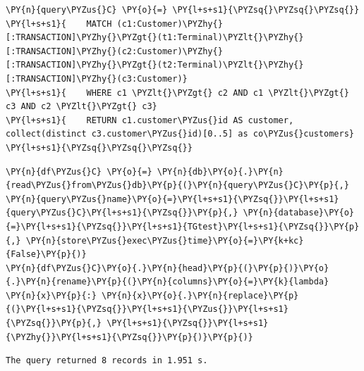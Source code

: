     \begin{tcolorbox}[breakable, size=fbox, boxrule=1pt, pad at break*=1mm,colback=cellbackground, colframe=cellborder]
\begin{Verbatim}[commandchars=\\\{\}]
\PY{n}{query\PYZus{}C} \PY{o}{=} \PY{l+s+s1}{\PYZsq{}\PYZsq{}\PYZsq{}}
\PY{l+s+s1}{    MATCH (c1:Customer)\PYZhy{}[:TRANSACTION]\PYZhy{}\PYZgt{}(t1:Terminal)\PYZlt{}\PYZhy{}[:TRANSACTION]\PYZhy{}(c2:Customer)\PYZhy{}[:TRANSACTION]\PYZhy{}\PYZgt{}(t2:Terminal)\PYZlt{}\PYZhy{}[:TRANSACTION]\PYZhy{}(c3:Customer)}
\PY{l+s+s1}{    WHERE c1 \PYZlt{}\PYZgt{} c2 AND c1 \PYZlt{}\PYZgt{} c3 AND c2 \PYZlt{}\PYZgt{} c3}
\PY{l+s+s1}{    RETURN c1.customer\PYZus{}id AS customer, collect(distinct c3.customer\PYZus{}id)[0..5] as co\PYZus{}customers}
\PY{l+s+s1}{\PYZsq{}\PYZsq{}\PYZsq{}}
\end{Verbatim}
\end{tcolorbox}

    \begin{tcolorbox}[breakable, size=fbox, boxrule=1pt, pad at break*=1mm,colback=cellbackground, colframe=cellborder]
\begin{Verbatim}[commandchars=\\\{\}]
\PY{n}{df\PYZus{}C} \PY{o}{=} \PY{n}{db}\PY{o}{.}\PY{n}{read\PYZus{}from\PYZus{}db}\PY{p}{(}\PY{n}{query\PYZus{}C}\PY{p}{,} \PY{n}{query\PYZus{}name}\PY{o}{=}\PY{l+s+s1}{\PYZsq{}}\PY{l+s+s1}{query\PYZus{}C}\PY{l+s+s1}{\PYZsq{}}\PY{p}{,} \PY{n}{database}\PY{o}{=}\PY{l+s+s1}{\PYZsq{}}\PY{l+s+s1}{TGtest}\PY{l+s+s1}{\PYZsq{}}\PY{p}{,} \PY{n}{store\PYZus{}exec\PYZus{}time}\PY{o}{=}\PY{k+kc}{False}\PY{p}{)}
\PY{n}{df\PYZus{}C}\PY{o}{.}\PY{n}{head}\PY{p}{(}\PY{p}{)}\PY{o}{.}\PY{n}{rename}\PY{p}{(}\PY{n}{columns}\PY{o}{=}\PY{k}{lambda} \PY{n}{x}\PY{p}{:} \PY{n}{x}\PY{o}{.}\PY{n}{replace}\PY{p}{(}\PY{l+s+s1}{\PYZsq{}}\PY{l+s+s1}{\PYZus{}}\PY{l+s+s1}{\PYZsq{}}\PY{p}{,} \PY{l+s+s1}{\PYZsq{}}\PY{l+s+s1}{\PYZhy{}}\PY{l+s+s1}{\PYZsq{}}\PY{p}{)}\PY{p}{)}
\end{Verbatim}
\end{tcolorbox}

    \begin{Verbatim}[commandchars=\\\{\}]
The query returned 8 records in 1.951 s.
    \end{Verbatim}
 
            
    
